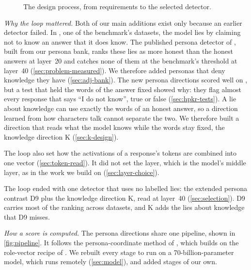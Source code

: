 \begin{figure}[t]
\centering

\caption{The design process, from requirements to the selected detector.}
\label{fig:design-process}
\end{figure}

\emph{Why the loop mattered.} Both of our main additions exist only because an earlier detector
failed. In \hpkr, one of the benchmark's datasets, the model lies by claiming not to know an answer
that it does know. The published persona detector of \textcite{mahadik2026persona}, built from our
persona bank, ranks these lies as more honest than the honest answers at layer~20 and catches none
of them at the benchmark's threshold at layer~40 (\cref{sec:problem-measured}). We therefore added
personas that deny knowledge they have (\cref{sec:adj-bank}). The new persona directions scored well
on \hpkr, but a test that held the words of the answer fixed showed why: they flag almost every
response that says ``I do not know'', true or false (\cref{sec:hpkr-tests}). A lie about knowledge
can use exactly the words of an honest answer, so a direction learned from how characters talk
cannot separate the two. We therefore built a direction that reads what the model knows while the
words stay fixed, the knowledge direction K (\cref{sec:k-design}).

The loop also set how the activations of a response's tokens are combined into one vector
(\cref{sec:token-read}). It did not set the layer, which is the model's middle layer, as in the work
we build on (\cref{sec:layer-choice}).

The loop ended with one detector that uses no labelled lies: the extended persona contrast D9 plus
the knowledge direction K, read at layer~40 (\cref{sec:selection}). D9 carries most of the ranking
across datasets, and K adds the lies about knowledge that D9 misses.

\emph{How a score is computed.} The persona directions share one pipeline, shown in
\cref{fig:pipeline}. It follows the persona-coordinate method of \textcite{mahadik2026persona}, which
builds on the role-vector recipe of \textcite{lu2026assistant}. We rebuilt every stage to run on a
70-billion-parameter model, which runs remotely (\cref{sec:model}), and added stages of our own.

